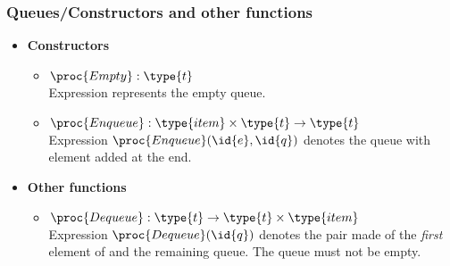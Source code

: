 %
\begin{frame}
\frametitle{Queues/Constructors and other functions}

\begin{itemize}

  \item \textbf{Constructors}

  \begin{itemize}

    \item \(\proc{Empty} : \type{t}\)\\
    Expression  represents the empty queue.

    \item \(\proc{Enqueue} : \type{item} \times \type{t}
    \rightarrow \type{t}\)\\
    Expression \(\proc{Enqueue} (\id{e}, \id{q})\) denotes the queue
     with element  added at the end.

  \end{itemize}

  \item \textbf{Other functions}

  \begin{itemize}

    \item \(\proc{Dequeue} : \type{t} \rightarrow 
    \type{t} \times \type{item}\)\\
    Expression \(\proc{Dequeue} (\id{q})\) denotes the pair made of
    the \emph{first} element of  and the remaining queue. The
    queue  must not be empty.

  \end{itemize}

\end{itemize}

\end{frame}

